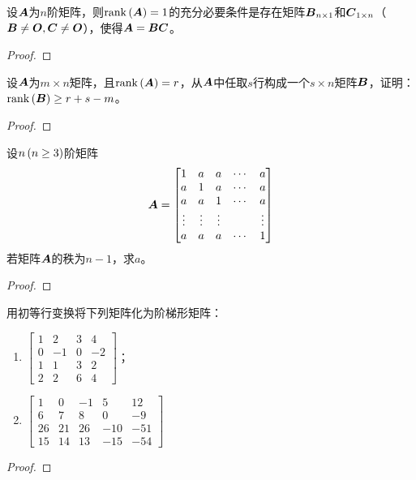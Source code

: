 \begin{problem}
设\(\boldsymbol{A}\)为\(n\)阶矩阵，则\(\mathrm{rank}\left( \boldsymbol{A} \right)=1\)的充分必要条件是存在矩阵\(\boldsymbol{B}_{n\times1}\)和\(\boldsymbol{C}_{1\times n}\)（\(\boldsymbol{B}\neq\boldsymbol{O},\boldsymbol{C}\neq\boldsymbol{O}\)），使得\(\boldsymbol{A}=\boldsymbol{B}\boldsymbol{C}\)。
\end{problem}
\begin{proof}

\end{proof}

\begin{problem}
设\(\boldsymbol{A}\)为\(m\times n\)矩阵，且\(\mathrm{rank}\left( \boldsymbol{A} \right)=r\)，从\(\boldsymbol{A}\)中任取\(s\)行构成一个\(s\times n\)矩阵\(\boldsymbol{B}\)，证明：\(\mathrm{rank}\left( \boldsymbol{B} \right)\ge r+s-m\)。
\end{problem}
\begin{proof}

\end{proof}

\begin{problem}
设\(n\left( n\ge3 \right)\)阶矩阵
\begin{equation*}
    \boldsymbol{A}=
    \begin{bmatrix}
        1      & a      & a      & \cdots & a      \\
        a      & 1      & a      & \cdots & a      \\
        a      & a      & 1      & \cdots & a      \\
        \vdots & \vdots & \vdots &        & \vdots \\
        a      & a      & a      & \cdots & 1
    \end{bmatrix}
\end{equation*}
若矩阵\(\boldsymbol{A}\)的秩为\(n-1\)，求\(a\)。
\end{problem}
\begin{proof}

\end{proof}

\begin{problem}
用初等行变换将下列矩阵化为阶梯形矩阵：
\begin{enumerate}
    \item \(\begin{bmatrix}1&2&3&4\\0&-1&0&-2\\1&1&3&2\\2&2&6&4\end{bmatrix}\)；
    \item \(\begin{bmatrix}1&0&-1&5&12\\6&7&8&0&-9\\26&21&26&-10&-51\\15&14&13&-15&-54\end{bmatrix}\)
\end{enumerate}
\end{problem}
\begin{proof}

\end{proof}

